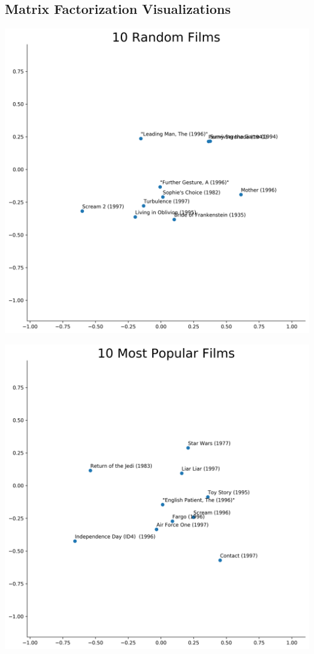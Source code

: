 \begin{appendices}
\section{Matrix Factorization Visualizations}
\begin{center}
\begin{minipage}{0.48\linewidth}
\label{appendix:viz-0}
\includegraphics[scale=0.35]{"10 Random Films"}
\captionsetup{width=.85\linewidth}
\end{minipage}
\hfill %
\begin{minipage}{0.48\linewidth}
\label{appendix:viz-1}
\includegraphics[scale=0.35]{"10 Most Popular Films"}

\end{minipage}
\end{center}
\end{appendices}

